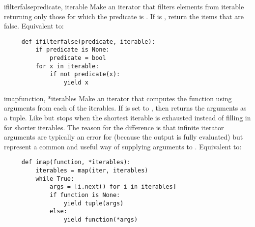 \begin{funcdesc}{ifilterfalse}{predicate, iterable}
  Make an iterator that filters elements from iterable returning only
  those for which the predicate is .
  If  is , return the items that are false.
  Equivalent to:

  \begin{verbatim}
     def ifilterfalse(predicate, iterable):
         if predicate is None:
             predicate = bool
         for x in iterable:
             if not predicate(x):
                 yield x
  \end{verbatim}
\end{funcdesc}

\begin{funcdesc}{imap}{function, *iterables}
  Make an iterator that computes the function using arguments from
  each of the iterables.  If  is set to , then
   returns the arguments as a tuple.  Like
   but stops when the shortest iterable is exhausted
  instead of filling in  for shorter iterables.  The reason
  for the difference is that infinite iterator arguments are typically
  an error for  (because the output is fully evaluated)
  but represent a common and useful way of supplying arguments to
  .
  Equivalent to:

  \begin{verbatim}
     def imap(function, *iterables):
         iterables = map(iter, iterables)
         while True:
             args = [i.next() for i in iterables]
             if function is None:
                 yield tuple(args)
             else:
                 yield function(*args)
  \end{verbatim}
\end{funcdesc}

